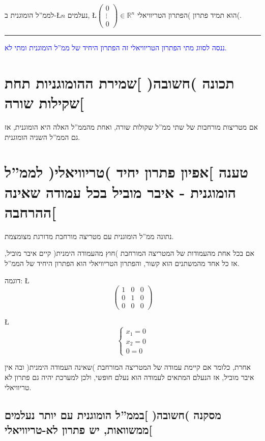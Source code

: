 \documentclass[english,hebrew]{article}
\begin{document}
לממ\textquotedblright ל הומוגנית ב-\L{$n$} נעלמים, \L{$\begin{pmatrix}0\\
\vdots\\
0
\end{pmatrix}\in\mathbb{R}^{n}$} הוא תמיד פתרון )הפתרון הטריוויאלי(.

\rule{1\linewidth}{1.5pt}

\textcolor{blue}{ננסה לסווג מתי הפתרון הטריוויאלי זה הפתרון היחיד
של ממ\textquotedblright ל הומוגנית ומתי לא.}

\section{תכונה )חשובה( {]}שמירת ההומוגניות תחת שקילות שורה{[}}

אם מטריצות מורחבות של שתי ממ\textquotedblright ל שקולות שורה, ואחת
מהממ\textquotedblright ל האלה היא הומוגנית, אז גם הממ\textquotedblright ל
השניה הומוגנית.

\section{טענה {]}אפיון פתרון יחיד )טריוויאלי( לממ\textquotedblright ל הומוגנית
- איבר מוביל בכל עמודה שאינה ההרחבה{[}}

נתונה ממ\textquotedblright ל הומוגנית עם מטריצה מורחבת מדורגת מצומצמת.

אם בכל אחת מהעמודות של המטריצה המורחבת )חוץ מהעמודה הימנית( קיים איבר
מוביל, אז כל אחד מהמשתנים הוא קשור, והפתרון הטריוויאלי הוא הפתרון
היחיד של הממ\textquotedblright ל.

דוגמה: \L{%
\[
\left(\begin{array}{cc|c}
1 & 0 & 0\\
0 & 1 & 0\\
0 & 0 & 0
\end{array}\right)
\]
}%

\L{%
\[
\begin{cases}
x_{1}=0\\
x_{2}=0\\
0=0
\end{cases}
\]
}%

אחרת, כלומר אם קיימת עמודה של המטריצה המורחבת )שאינה העמודה הימנית(
ובה אין איבר מוביל, אז הנעלם המתאים לעמודה הוא נעלם חופשי, ולכן למערכת
יהיה גם פתרון לא טריוויאלי.

\subsection{מסקנה )חשובה( {]}בממ\textquotedblright ל הומוגנית עם יותר נעלמים
ממשוואות, יש פתרון לא-טריוויאלי{[}}
\end{document}

